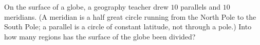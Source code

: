 On the surface of a globe, a geography teacher drew $10$ parallels and $10$ meridians. (A meridian is a half great circle running from the North Pole to the South Pole; a parallel is a circle of constant latitude, not through a pole.) Into how many regions has the surface of the globe been divided?
